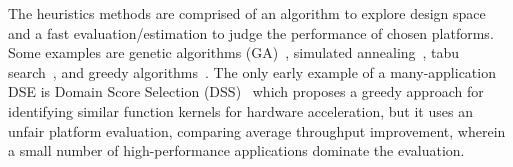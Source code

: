 The heuristics methods are comprised of an algorithm to explore design space and a fast evaluation/estimation to judge the performance of chosen platforms.
Some examples are genetic algorithms (GA)~\cite{quan2014towards}, simulated annealing~\cite{liang2013hardware}, tabu search~\cite{wu2013efficient}, and greedy algorithms~\cite{tang2015hardware}.
The only early example of a many-application DSE is Domain Score Selection (DSS)~\cite{zhang2018ds} which proposes a greedy approach for identifying similar function kernels for hardware acceleration, but it uses an unfair platform evaluation, comparing average throughput improvement, wherein a small number of high-performance applications dominate the evaluation. 



